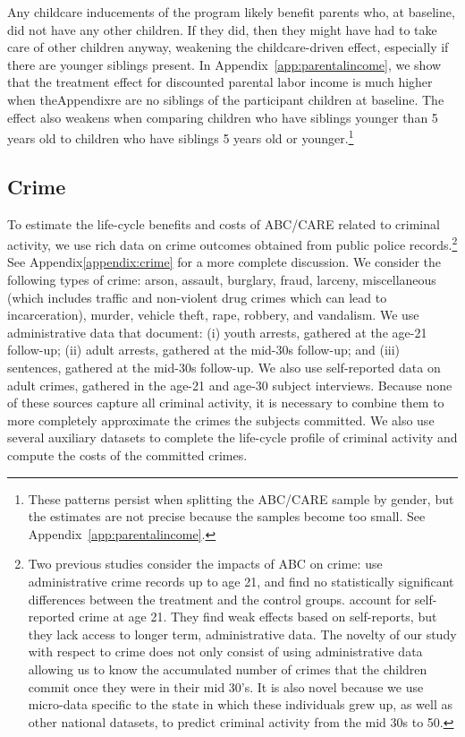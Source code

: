 Any childcare inducements of the program likely benefit parents who, at baseline, did not have any other children. If they did, then they might have had to take care of other children anyway, weakening the childcare-driven effect, especially if there are younger siblings present. In Appendix~\ref{app:parentalincome}, we show that the treatment effect for discounted parental labor income is much higher when theAppendixre are no siblings of the participant children at baseline. The effect also weakens when comparing children who have siblings younger than 5 years old to children who have siblings 5 years old or younger.\footnote{These patterns persist when splitting the ABC/CARE sample by gender, but the estimates are not precise because the samples become too small. See Appendix~\ref{app:parentalincome}.}

\subsection{Crime}\label{sec:crime}

To estimate the life-cycle benefits and costs of ABC/CARE related to criminal activity, we use rich data on crime outcomes obtained from public police records.\footnote{Two previous studies consider the impacts of ABC on crime: \citet{Clarke_Campbell_1998_ABC_Comparison_ECRQ} use administrative crime records up to age 21, and find no statistically significant differences between the treatment and the control groups. \cite{Barnett_Masse_2002_benefitcost,Barnett_Masse_2007_EER} account for self-reported crime at age 21. They find weak effects based on self-reports, but they lack access to longer term, administrative data. The novelty of our study with respect to crime does not only consist of using administrative data allowing us to know the accumulated number of crimes that the children commit once they were in their mid 30's. It is also novel because we use micro-data specific to the state in which these individuals grew up, as well as other national datasets, to predict criminal activity from the mid 30s to 50.} See Appendix\ref{appendix:crime} for a more complete discussion. We consider the following types of crime: arson, assault, burglary, fraud, larceny, miscellaneous (which includes traffic and non-violent drug crimes which can lead to incarceration), murder, vehicle theft, rape, robbery, and vandalism. We use administrative data that document: (i) youth arrests, gathered at the age-21 follow-up; (ii) adult arrests, gathered at the mid-30s follow-up; and (iii) sentences, gathered at the mid-30s follow-up. We also use self-reported data on adult crimes, gathered in the age-21 and age-30 subject interviews. Because none of these sources capture all criminal activity, it is necessary to combine them to more completely approximate the crimes the subjects committed. We also use several auxiliary datasets to complete the life-cycle profile of criminal activity and compute the costs of the committed crimes.

